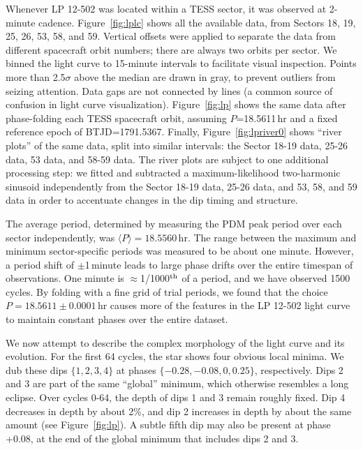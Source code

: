 \documentclass[11pt,twocolumn,tighten]{aastex63}
\begin{document}
Whenever LP 12-502 was located within a TESS sector, it was observed
at 2-minute cadence.  Figure~\ref{fig:lplc} shows all the available
data, from Sectors 18, 19, 25, 26, 53, 58, and 59. Vertical offsets
were applied to separate the data from different spacecraft orbit
numbers; there are always two orbits per sector.  We binned the light
curve to 15-minute intervals to facilitate visual inspection.  Points
more than 2.5$\sigma$ above the median are drawn in gray, to prevent
outliers from seizing attention.  Data gaps are not connected by lines
(a common source of confusion in light curve visualization).
Figure~\ref{fig:lp} shows the same data after phase-folding each TESS
spacecraft orbit, assuming $P$=18.5611\,hr and a fixed reference epoch
of BTJD=1791.5367.  Finally, Figure~\ref{fig:lpriver0} shows ``river
plots'' of the same data, split into similar intervals: the Sector
18-19 data, 25-26 data, 53 data, and 58-59 data.  The river plots are
subject to one additional processing step: we fitted and subtracted a
maximum-likelihood two-harmonic sinusoid independently from the Sector
18-19 data, 25-26 data, and 53, 58, and 59 data in order to accentuate
changes in the dip timing and structure.

The average period, determined by measuring the PDM peak period over
each sector independently, was $\langle P \rangle = 18.5560$\,hr.  The
range between the maximum and minimum sector-specific periods was
measured to be about one minute.   However, a period shift of
$\pm$1\,minute leads to large phase drifts over the entire timespan of
observations.  One minute is $\approx$1/1000$^{\rm th}$ of a period,
and we have observed 1500 cycles.  By folding with a fine grid of
trial periods, we found that the choice $P=18.5611 \pm 0.0001$\,hr causes
more of the features in the LP 12-502 light curve to maintain constant
phases over the entire dataset.

We now attempt to describe the complex morphology of the light curve
and its evolution.  For the first 64 cycles, the star shows four
obvious local minima.  We dub these dips $\{ 1, 2, 3, 4 \}$ at phases
$\{ -0.28, -0.08, 0, 0.25 \}$, respectively.  Dips 2 and 3 are part of
the same ``global'' minimum, which otherwise resembles a long eclipse.
Over cycles 0-64, the depth of dips 1 and 3 remain roughly fixed.  Dip
4 decreases in depth by about 2\%, and dip 2 increases in depth by
about the same amount (see Figure~\ref{fig:lp}).  A subtle fifth dip
may also be present at phase +0.08, at the end of the global minimum
that includes dips 2 and 3.
\end{document}
